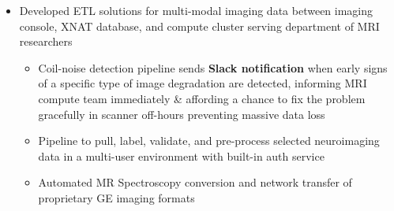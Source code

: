 \documentclass[10pt,a4paper,ragged2e]{altacv}
\begin{document}
\begin{fullwidth}
\begin{itemize}[label={}]
\end{itemize}

\divider

\begin{itemize}[label={}, noitemsep]
    \item Developed ETL solutions for multi-modal imaging data between imaging console, XNAT database, and compute cluster serving department of MRI researchers

    \begin{itemize}[label={-}, noitemsep]
        \item Coil-noise detection pipeline sends \textbf{Slack notification} when early signs of a specific type of image degradation are detected, informing MRI compute team immediately \& affording a chance to fix the problem gracefully in scanner off-hours preventing massive data loss
        \item Pipeline to pull, label, validate, and pre-process selected neuroimaging data in a multi-user environment with built-in auth service


        \item Automated MR Spectroscopy conversion and network transfer of proprietary GE imaging formats

    \end{itemize}
\end{itemize}

\end{fullwidth}


\divider

\end{document}
